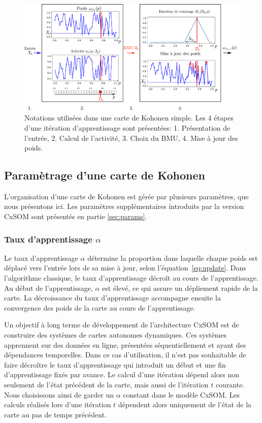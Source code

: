 \documentclass[../main]{subfiles}
\begin{document}
\begin{figure}
\centering
\includegraphics[width=\textwidth]{one_map_one_layer2.pdf}
\caption{Notations utilisées dans une carte de Kohonen simple. Les 4 étapes d'une itération d'apprentissage sont présentées: 1. Présentation de l'entrée, 2. Calcul de l'activité, 3. Choix du BMU, 4. Mise à jour des poids. \label{fig:one_map_not}}
\end{figure}

\subsection{Paramètrage d'une carte de Kohonen}\label{sec:parametres_carte}

L'organisation d'une carte de Kohonen est gérée par plusieurs paramètres, que nous présentons ici.
Les paramètres supplémentaires introduits par la version CxSOM sont présentés en partie \ref{sec:params}.

\subsubsection{Taux d'apprentissage $\alpha$}

Le taux d'apprentissage $\alpha$ détermine la proportion dans laquelle chaque poids est déplacé vers l'entrée lors de sa mise à jour, selon l'équation~\ref{eq:update}. 
Dans l'algorithme classique, le taux d'apprentissage décroît au cours de l'apprentissage. Au début de l'apprentissage, $\alpha$ est élevé, ce qui assure un dépliement rapide de la carte. La décroissance du taux d'apprentissage accompagne ensuite la convergence des poids de la carte au cours de l'apprentissage.

Un objectif à long terme de développement de l'architecture CxSOM est de construire des systèmes de cartes autonomes dynamiques. Ces systèmes apprennent sur des données en ligne, présentées séquentiellement et ayant des dépendances temporelles. Dans ce cas d'utilisation, il n'est pas souhaitable de faire décroître le taux d'apprentissage qui introduit un début et une fin d'apprentissage fixés par avance. Le calcul d'une itération dépend alors non seulement de l'état précédent de la carte, mais aussi de l'itération $t$ courante. 
Nous choisissons ainsi de garder un $\alpha$ constant dans le modèle CxSOM.
Les calculs réalisés lors d'une itération $t$ dépendent alors uniquement de l'état de la carte au pas de temps précédent.
\end{document}
